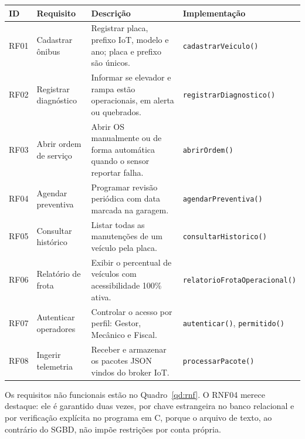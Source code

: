 \documentclass[12pt,a4paper,oneside]{report}
\newcommand{\fonte}[1]{\par\vspace{2pt}{\small Fonte: #1}\par}
\begin{document}
\begin{quadro}[H]
  \caption{Requisitos funcionais}\label{qd:rf}
  \small\singlespacing
  \renewcommand{\arraystretch}{1.25}
  \begin{tabularx}{\textwidth}{|>{\centering\arraybackslash}p{1.1cm}|>{\raggedright\arraybackslash}p{3.3cm}|X|>{\raggedright\arraybackslash\footnotesize}p{4.1cm}|}
    \hline
    \rowcolor{gray!15}\textbf{ID} & \textbf{Requisito} & \textbf{Descrição} & \textbf{Implementação} \\ \hline
    RF01 & Cadastrar ônibus & Registrar placa, prefixo IoT, modelo e ano; placa e prefixo são únicos. & \texttt{cadastrarVeiculo()} \\ \hline
    RF02 & Registrar diagnóstico & Informar se elevador e rampa estão operacionais, em alerta ou quebrados. & \texttt{registrarDiagnostico()} \\ \hline
    RF03 & Abrir ordem de serviço & Abrir OS manualmente ou de forma automática quando o sensor reportar falha. & \texttt{abrirOrdem()} \\ \hline
    RF04 & Agendar preventiva & Programar revisão periódica com data marcada na garagem. & \texttt{agendarPreventiva()} \\ \hline
    RF05 & Consultar histórico & Listar todas as manutenções de um veículo pela placa. & \texttt{consultarHistorico()} \\ \hline
    RF06 & Relatório de frota & Exibir o percentual de veículos com acessibilidade 100\% ativa. & \texttt{relatorioFrota}\newline\texttt{Operacional()} \\ \hline
    RF07 & Autenticar operadores & Controlar o acesso por perfil: Gestor, Mecânico e Fiscal. & \texttt{autenticar()}, \texttt{permitido()} \\ \hline
    RF08 & Ingerir telemetria & Receber e armazenar os pacotes JSON vindos do broker IoT. & \texttt{processarPacote()} \\ \hline
  \end{tabularx}
  \fonte{Elaborado pelo autor (2026).}
\end{quadro}

Os requisitos não funcionais estão no Quadro~\ref{qd:rnf}. O RNF04 merece destaque: ele é garantido duas
vezes, por chave estrangeira no banco relacional e por verificação explícita no programa em C, porque o
arquivo de texto, ao contrário do SGBD, não impõe restrições por conta própria.
\end{document}
